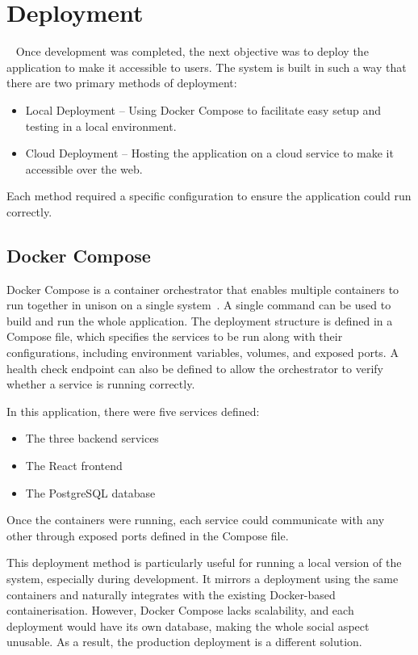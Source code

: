 \chapter{Deployment}~\label{cha:deployment}
Once development was completed, the next objective was to deploy the application to make it accessible to users. The system is built in such a way that there are two primary methods of deployment:

\begin{itemize}
    \item Local Deployment – Using Docker Compose to facilitate easy setup and testing in a local environment.
    \item Cloud Deployment – Hosting the application on a cloud service to make it accessible over the web.
\end{itemize}

Each method required a specific configuration to ensure the application could run correctly.

\section{Docker Compose}
Docker Compose is a container orchestrator that enables multiple containers to run together in unison on a single system~\cite{DockerCompose}. A single command can be used to build and run the whole application. The deployment structure is defined in a Compose file, which specifies the services to be run along with their configurations, including environment variables, volumes, and exposed ports. A health check endpoint can also be defined to allow the orchestrator to verify whether a service is running correctly.

In this application, there were five services defined:
\begin{itemize}
    \item The three backend services
    \item The React frontend
    \item The PostgreSQL database
\end{itemize}

Once the containers were running, each service could communicate with any other through exposed ports defined in the Compose file.

This deployment method is particularly useful for running a local version of the system, especially during development. It mirrors a deployment using the same containers and naturally integrates with the existing Docker-based containerisation. However, Docker Compose lacks scalability, and each deployment would have its own database, making the whole social aspect unusable. As a result, the production deployment is a different solution.

